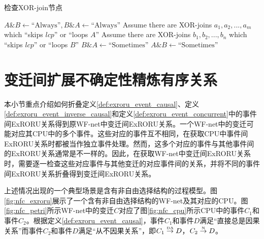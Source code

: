 \begin{algorithm}[htbp]
  \LinesNumbered
  \caption{检查XOR-join节点}
  \label{algo:exroru_event_concurrent_xorjoin}
   {
    \nl $A\&B\leftarrow\text{``Always''},B\&A\leftarrow\text{``Always''}$\;
    \nl Assume there are XOR-joins $a_{1},a_{2},...,a_{m}$ which ``skips $lcp$'' or ``loops $A$''\;
    \nl Assume there are XOR-joins $b_{1},b_{2},...,b_{n}$ which ``skips $lcp$'' or ``loops $B$''\;
    \nl {} {
      \nl {} {
        \nl {} {
  	      \nl {}
        } \nl {}
      }
    }
    \nl {} {
  	  \nl $B\&A\leftarrow\text{``Sometimes''}$\;
  	}
  	\nl {} {
  	  \nl $A\&B\leftarrow\text{``Sometimes''}$\;
  	}
  	\nl {}
  }
\end{algorithm}

\section{变迁间扩展不确定性精炼有序关系}\label{sec:exroru_transition}
本小节重点介绍如何折叠定义\ref{def:exroru_event_causal}、定义\ref{def:exroru_event_inverse_causal}和定义\ref{def:exroru_event_concurrent}中的事件间ExRORU关系得到原WF-net中变迁间ExRORU关系。一个WF-net中的变迁可能对应其CPU中的多个事件。这些对应的事件互不相同，在获取CPU中事件间ExRORU关系时都被当作独立事件处理。然而，这多个对应的事件与其他事件间的ExRORU关系通常是不一样的。因此，在获取WF-net中变迁间ExRORU关系时，需要逐一检查这些对应事件与其他变迁的对应事件间的关系，并将不同的事件间ExRORU关系折叠得到变迁间ExRORU关系。

上述情况出现的一个典型场景是含有非自由选择结构的过程模型。图\ref{fig:nfc_exroru}展示了一个含有非自由选择结构的WF-net及其对应的CPU。图\ref{fig:nfc_petri}所示WF-net中的变迁$C$对应了图\ref{fig:nfc_cpu}所示CPU中的事件$C_{1}$和事件$C_{2}$。根据定义\ref{def:exroru_event_causal}，事件$C_{1}$和事件$D$满足“直接总是因果关系”而事件$C_{2}$和事件$D$满足“从不因果关系”，即$C_{1}\overset{\text{\tiny{DA}}}{\rightarrow}D$，$C_{2}\overset{\text{\tiny{N}}}{\rightarrow}D$。


